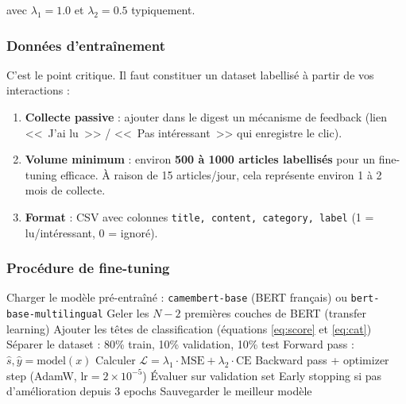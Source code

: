\documentclass[11pt, a4paper]{article}
\begin{document}
avec $\lambda_1 = 1.0$ et $\lambda_2 = 0.5$ typiquement.

\subsubsection{Données d'entraînement}

C'est le point critique. Il faut constituer un dataset labellisé à partir de vos interactions :

\begin{enumerate}
    \item \textbf{Collecte passive} : ajouter dans le digest un mécanisme de feedback (lien <<~J'ai lu~>> / <<~Pas intéressant~>> qui enregistre le clic).
    \item \textbf{Volume minimum} : environ \textbf{500 à 1000 articles labellisés} pour un fine-tuning efficace. À raison de 15 articles/jour, cela représente environ 1 à 2 mois de collecte.
    \item \textbf{Format} : CSV avec colonnes \texttt{title, content, category, label} (1 = lu/intéressant, 0 = ignoré).
\end{enumerate}

\subsubsection{Procédure de fine-tuning}

\begin{algorithm}[H]
\caption{Fine-tuning du classifieur BERT}
\begin{algorithmic}[1]
\State Charger le modèle pré-entraîné : \texttt{camembert-base} (BERT français) ou \texttt{bert-base-multilingual}
\State Geler les $N-2$ premières couches de BERT (transfer learning)
\State Ajouter les têtes de classification (équations \ref{eq:score} et \ref{eq:cat})
\State Séparer le dataset : 80\% train, 10\% validation, 10\% test
        \State Forward pass : $\hat{s}, \hat{y} = \text{model}(x)$
        \State Calculer $\mathcal{L} = \lambda_1 \cdot \text{MSE} + \lambda_2 \cdot \text{CE}$
        \State Backward pass + optimizer step (AdamW, $\text{lr} = 2 \times 10^{-5}$)
    \EndFor
    \State Évaluer sur validation set
    \State Early stopping si pas d'amélioration depuis 3 epochs
\EndFor
\State Sauvegarder le meilleur modèle
\end{algorithmic}
\end{algorithm}
\end{document}
